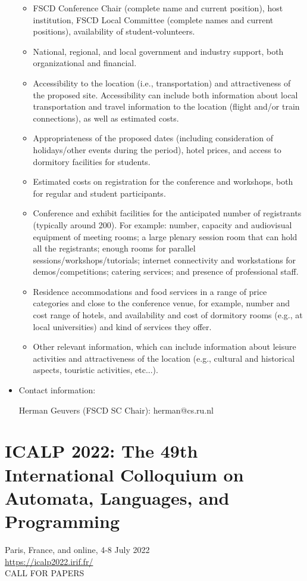 \documentclass[prodmode,acmtecs]{acmsmall} %
\begin{document}
\begin{itemize}
\begin{itemize}\item  FSCD Conference Chair (complete name and current position), host institution, FSCD Local Committee (complete names and current positions), availability of student-volunteers.
\item  National, regional, and local government and industry support, both organizational and financial.
\item  Accessibility to the location (i.e., transportation) and attractiveness of the proposed site. Accessibility can include both information about local transportation and travel information to the location (flight and/or train connections), as well as estimated costs.
\item  Appropriateness of the proposed dates (including consideration of holidays/other events during the period), hotel prices, and access to dormitory facilities for students.
\item  Estimated costs on registration for the conference and workshops, both for regular and student participants.
\item  Conference and exhibit facilities for the anticipated number of registrants (typically around 200). For example: number, capacity and audiovisual equipment of meeting rooms; a large plenary session room that can hold all the registrants; enough rooms for parallel sessions/workshops/tutorials; internet connectivity and workstations for demos/competitions; catering services; and presence of professional staff.
\item  Residence accommodations and food services in a range of price categories and close to the conference venue, for example, number and cost range of hotels, and availability and cost of dormitory rooms (e.g., at local universities) and kind of services they offer.
\item  Other relevant information, which can include information about leisure activities and attractiveness of the location (e.g., cultural and historical aspects, touristic activities, etc...).
\end{itemize} 
\item  Contact information: 
 
  Herman Geuvers (FSCD SC Chair): herman@cs.ru.nl 
 
\end{itemize}\section{ICALP 2022: The 49th International Colloquium on Automata, Languages, and Programming}\label{ICALP2022}   Paris, France, and online, 4-8 July 2022\\ 
   \href{https://icalp2022.irif.fr/}{https://icalp2022.irif.fr/}\\ 
CALL FOR PAPERS 
\end{document}

